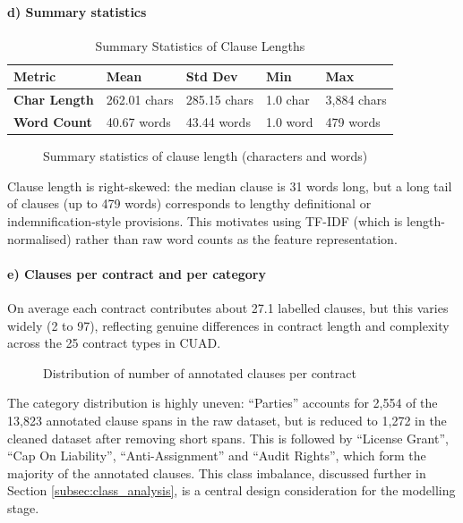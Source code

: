 \documentclass[12pt, a4paper]{report}
\begin{document}
\paragraph{d) Summary statistics}
\begin{table}[h]
\centering
\small
\begin{tabular}{p{3.5cm}p{3cm}p{3cm}p{3cm}p{2.5cm}}
\toprule
\textbf{Metric} & \textbf{Mean} & \textbf{Std Dev} & \textbf{Min} & \textbf{Max} \\
\midrule
\textbf{Char Length} & 262.01 chars & 285.15 chars & 1.0 char & 3,884 chars \\
\textbf{Word Count} & 40.67 words & 43.44 words & 1.0 word & 479 words \\
\bottomrule
\end{tabular}
\caption{Summary Statistics of Clause Lengths}
\label{tab:summary_stats}
\end{table}

\begin{figure}[h]
\centering
{}
\caption{Summary statistics of clause length (characters and words)}
\label{fig:summary_stats}
\end{figure}

Clause length is right-skewed: the median clause is 31 words long, but a long tail of clauses (up to 479 words) corresponds to lengthy definitional or indemnification-style provisions. This motivates using TF-IDF (which is length-normalised) rather than raw word counts as the feature representation.

\paragraph{e) Clauses per contract and per category}
On average each contract contributes about 27.1 labelled clauses, but this varies widely (2 to 97), reflecting genuine differences in contract length and complexity across the 25 contract types in CUAD.
\begin{figure}[h]
\centering
{}
\caption{Distribution of number of annotated clauses per contract}
\label{fig:clauses_per_contract}
\end{figure}

The category distribution is highly uneven: ``Parties'' accounts for 2,554 of the 13,823 annotated clause spans in the raw dataset, but is reduced to 1,272 in the cleaned dataset after removing short spans. This is followed by ``License Grant'', ``Cap On Liability'', ``Anti-Assignment'' and ``Audit Rights'', which form the majority of the annotated clauses. This class imbalance, discussed further in Section \ref{subsec:class_analysis}, is a central design consideration for the modelling stage.
\end{document}
